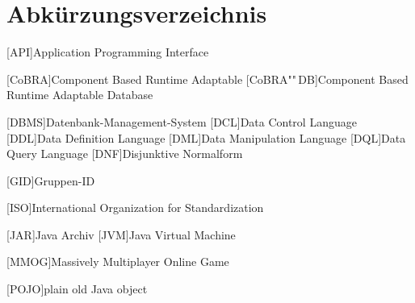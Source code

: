 \chapter*{Abkürzungsverzeichnis}

\vspace{\topskip}


\begin{acronym}[xxxxxxxxxxxx]
	\setlength{\itemsep}{-\parsep}
	\setlength{\itemindent}{1.5em}
	[API]{Application Programming Interface}

	\vspace{\parsep} 
	[\mbox{CoBRA}]{Com\-po\-nent Based Run\-time Adapt\-able}
	[\mbox{CoBRA}""\,DB]{Com\-po\-nent Based Run\-time Adapt\-able Database}

	\vspace{\parsep}
	[DBMS]{Datenbank-Management-System}
	[DCL]{Data Control Language}
	[DDL]{Data Definition Language}
	[DML]{Data Manipulation Language}
	[DQL]{Data Query Language}
	[DNF]{Disjunktive Normalform}


	\vspace{\parsep}
	[GID]{Gruppen-ID}



	[ISO]{International Organization for Standardization}
	
	\vspace{\parsep}
	[JAR]{Java Archiv}
	[JVM]{Java Virtual Machine}
	


	\vspace{\parsep}
	[MMOG]{Massively Multiplayer Online Game}


	
	[POJO]{plain old Java object}

	


\end{acronym}
